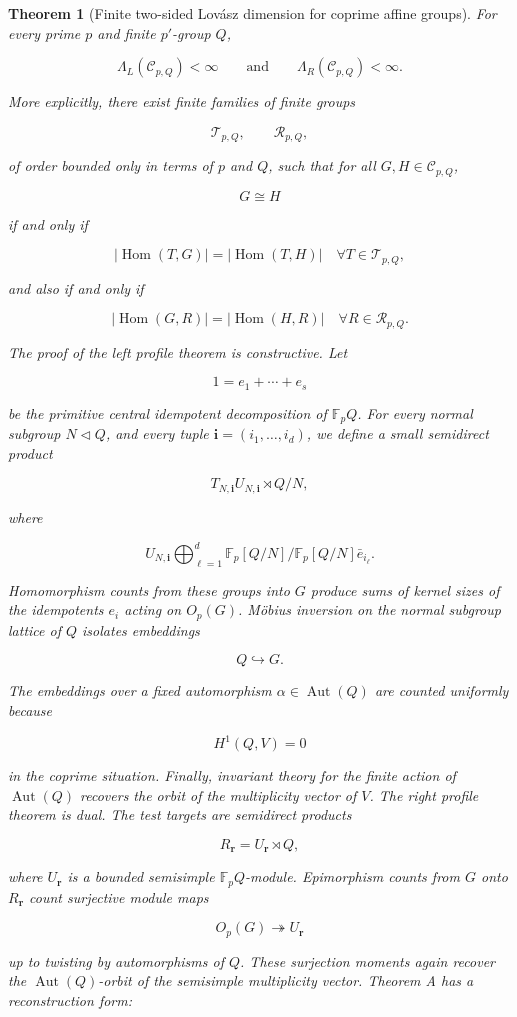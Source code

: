 \documentclass[11pt]{article}
\newtheorem{theorem}{Theorem}[section]
\begin{document}
\begin{theorem}[Finite two-sided Lovász dimension for coprime affine groups]
For every prime $p$ and finite $p'$-group $Q$,

\[
\Lambda_L(\mathcal C_{p,Q})<\infty
\qquad\text{and}\qquad
\Lambda_R(\mathcal C_{p,Q})<\infty.
\]

More explicitly, there exist finite families of finite groups

\[
\mathcal T_{p,Q},
\qquad
\mathcal R_{p,Q},
\]

of order bounded only in terms of $p$ and $Q$, such that for all $G,H\in\mathcal C_{p,Q}$,

\[
G\cong H
\]

if and only if

\[
|\operatorname{Hom}(T,G)|=|\operatorname{Hom}(T,H)|
\quad\forall T\in\mathcal T_{p,Q},
\]

and also if and only if

\[
|\operatorname{Hom}(G,R)|=|\operatorname{Hom}(H,R)|
\quad\forall R\in\mathcal R_{p,Q}.
\]

The proof of the left profile theorem is constructive. Let

\[
1=e_1+\cdots+e_s
\]

be the primitive central idempotent decomposition of $\mathbb F_pQ$. For every normal subgroup $N\lhd Q$, and every tuple $\mathbf i=(i_1,\ldots,i_d)$, we define a small semidirect product

\[
T_{N,\mathbf i}
U_{N,\mathbf i}\rtimes Q/N,
\]

where

\[
U_{N,\mathbf i}
\bigoplus_{\ell=1}^d
\mathbb F_p[Q/N]/
\mathbb F_p[Q/N]\bar e_{i_\ell}.
\]

Homomorphism counts from these groups into $G$ produce sums of kernel sizes of the idempotents $e_i$ acting on $O_p(G)$. Möbius inversion on the normal subgroup lattice of $Q$ isolates embeddings

\[
Q\hookrightarrow G.
\]

The embeddings over a fixed automorphism $\alpha\in\operatorname{Aut}(Q)$ are counted uniformly because

\[
H^1(Q,V)=0
\]

in the coprime situation. Finally, invariant theory for the finite action of $\operatorname{Aut}(Q)$ recovers the orbit of the multiplicity vector of $V$. The right profile theorem is dual. The test targets are semidirect products

\[
R_{\mathbf r}=U_{\mathbf r}\rtimes Q,
\]

where $U_{\mathbf r}$ is a bounded semisimple $\mathbb F_pQ$-module. Epimorphism counts from $G$ onto $R_{\mathbf r}$ count surjective module maps

\[
O_p(G)\twoheadrightarrow U_{\mathbf r}
\]

up to twisting by automorphisms of $Q$. These surjection moments again recover the $\operatorname{Aut}(Q)$-orbit of the semisimple multiplicity vector. Theorem A has a reconstruction form:

\end{theorem}
\end{document}

